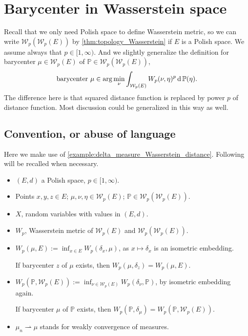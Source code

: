\section{Barycenter in Wasserstein space}

Recall that we only need Polish space to define Wasserstein metric, so we can write $\mathcal{W}_p(\mathcal{W}_p(E))$
by \cref{thm:topology_Wasserstein} if $E$ is a Polish space.
We assume always that $p \in [1, \infty)$.
And we slightly generalize the definition for barycenter $\mu \in \mathcal{W}_p(E)$
of $\mathbb{P} \in \mathcal{W}_p(\mathcal{W}_p(E))$,
\[
	\text{barycenter } \mu \in \arg \min_{\nu} \int_{\mathcal{W}_p(E)} W_p(\nu, \eta)^p \operatorname{d} \mathbb{P} (\eta).
\]
The difference here is that squared distance function is replaced by power $p$ of distance function.
Most discussion could be generalized in this way as well.

\subsection{Convention, or abuse of language}

\label{subsection:convention}
Here we make use of \cref{example:delta_measure_Wasserstein_distance}.
Following will be recalled when necessary.

\begin{itemize}
	\item $(E,d)$ a Polish space, $p \in [1, \infty)$.
	\item Points $x,y,z \in E$; $\mu, \nu, \eta \in \mathcal{W}_p(E)$; $\mathbb{P} \in \mathcal{W}_p(\mathcal{W}_p(E))$.
	\item $X$, random variables with values in $(E, d)$.
	\item $W_p$, Wasserstein metric of $\mathcal{W}_p(E)$ and $\mathcal{W}_p(\mathcal{W}_p(E))$.
	\item $W_p(\mu, E):= \inf_{x \in E}W_p(\delta_x, \mu)$,
	      as $x \mapsto \delta_x$ is an isometric embedding.

	      If barycenter $z$ of $\mu$ exists, then $W_p(\mu, \delta_z)=W_p(\mu, E)$.
	\item $W_p(\mathbb{P}, \mathcal{W}_p(E)) := \inf_{\nu \in \mathcal{W}_p(E)} W_p(\delta_\nu, \mathbb{P})$, by isometric embedding again.

	      If barycenter $\mu$ of $\mathbb{P}$ exists, then $W_p(\mathbb{P}, \delta_\mu)=W_p(\mathbb{P}, \mathcal{W}_p(E))$.
	\item $\mu_n \rightharpoonup \mu$ stands for weakly convergence of measures.

\end{itemize}


